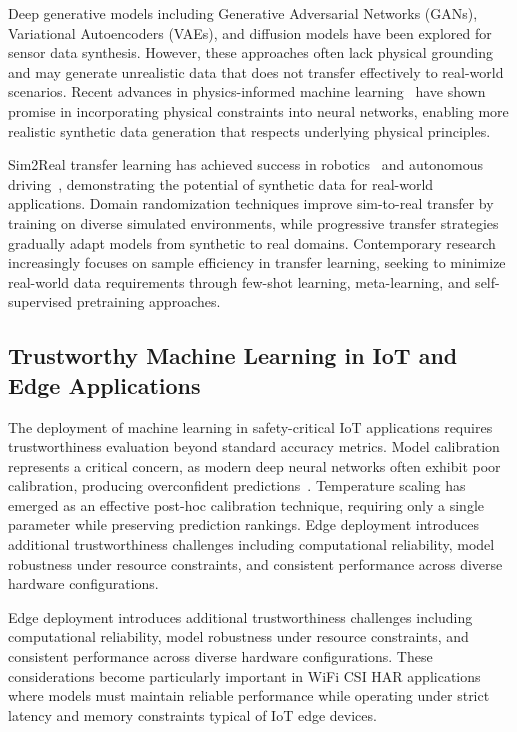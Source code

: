 \documentclass[journal]{IEEEtran}
\begin{document}
Deep generative models including Generative Adversarial Networks (GANs), Variational Autoencoders (VAEs), and diffusion models have been explored for sensor data synthesis. However, these approaches often lack physical grounding and may generate unrealistic data that does not transfer effectively to real-world scenarios. Recent advances in physics-informed machine learning~\cite{raissi2019physics,karniadakis2021physics} have shown promise in incorporating physical constraints into neural networks, enabling more realistic synthetic data generation that respects underlying physical principles.

Sim2Real transfer learning has achieved success in robotics~\cite{sim2real_robotics2017} and autonomous driving~\cite{sim2real_autonomous2019}, demonstrating the potential of synthetic data for real-world applications. Domain randomization techniques improve sim-to-real transfer by training on diverse simulated environments, while progressive transfer strategies gradually adapt models from synthetic to real domains. Contemporary research increasingly focuses on sample efficiency in transfer learning, seeking to minimize real-world data requirements through few-shot learning, meta-learning, and self-supervised pretraining approaches.

\subsection{Trustworthy Machine Learning in IoT and Edge Applications}

The deployment of machine learning in safety-critical IoT applications requires trustworthiness evaluation beyond standard accuracy metrics. Model calibration represents a critical concern, as modern deep neural networks often exhibit poor calibration, producing overconfident predictions~\cite{calibration_guo2017}. Temperature scaling has emerged as an effective post-hoc calibration technique, requiring only a single parameter while preserving prediction rankings. Edge deployment introduces additional trustworthiness challenges including computational reliability, model robustness under resource constraints, and consistent performance across diverse hardware configurations.

Edge deployment introduces additional trustworthiness challenges including computational reliability, model robustness under resource constraints, and consistent performance across diverse hardware configurations. These considerations become particularly important in WiFi CSI HAR applications where models must maintain reliable performance while operating under strict latency and memory constraints typical of IoT edge devices.
\end{document}
